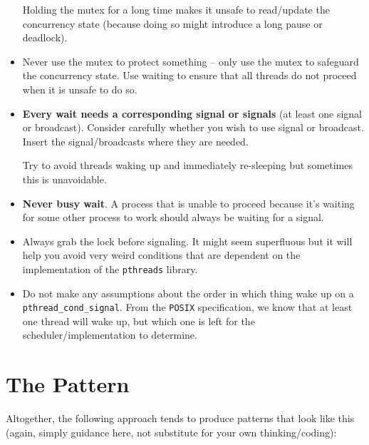 \documentclass[11pt,usletter]{article}
\begin{document}
\begin{itemize}
    \noindent Holding the mutex for a long time makes it unsafe to read/update
    the concurrency state (because doing so might introduce a long pause or
    deadlock).

  \item  Never use the mutex to protect something – only use the mutex to
    safeguard the concurrency state.  Use waiting to ensure that all threads do
    not proceed when it is unsafe to do so. 

  \item  {\bf Every wait needs a corresponding signal or signals} (at least one
    signal or broadcast).  Consider carefully whether you wish to use signal or
    broadcast. Insert the signal/broadcasts where they are needed. 

    \noindent Try to avoid threads waking up and immediately re-sleeping but
    sometimes this is unavoidable. 

  \item  {\bf Never busy wait}.  A process that is unable to proceed because
    it’s waiting for some other process to work should always be waiting for a
    signal.

  \item Always grab the lock before signaling. It might seem superfluous but it
    will help you avoid very weird conditions that are dependent on the
    implementation of the {\tt pthreads} library.

  \item  Do not make any assumptions about the order in which thing wake up on
    a {\tt pthread\_cond\_signal}. From the {\tt POSIX} specification, we know
    that at least one thread will wake up, but which one is left for the
    scheduler/implementation to determine.
\end{itemize}

\section{The Pattern}

Altogether, the following approach tends to produce patterns that look like
this (again, simply guidance here, not substitute for your own
thinking/coding):
\end{document}
